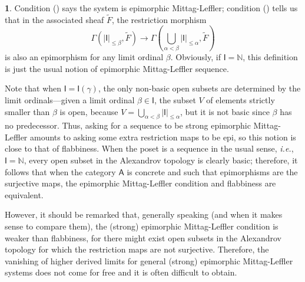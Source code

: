 \documentclass[reqno,11pt]{amsart}
\theoremstyle{plain}
\theoremstyle{remark}
\theoremstyle{definition}
\newtheorem{cosa}[thm]{}
\numberwithin{equation}{thm}
\newcommand{\SA}{\mathsf{A}}
\newcommand{\SI}{\mathsf{I}}
\newcommand{\NN}{\mathbb{N}}
\newcommand{\lto}{\longrightarrow}
\begin{document}
\begin{cosa}
		Condition () says the system is epimorphic Mittag-Leffler; condition () tells us that in the associated sheaf $\tilde{F}$, the restriction morphism 
		\[
			\Gamma(|\SI|_{\leq \beta}, \tilde{F}) \lto \Gamma(\bigcup_{\alpha < \beta} |\SI|_{\leq \alpha}, \tilde{F})
		\]
		is also an epimorphism for any limit ordinal $\beta$. Obviously, if $\SI = \NN$, this definition is just the usual notion of epimorphic Mittag-Leffler sequence.
		
		Note that when $\SI = \SI(\gamma)$, the only non-basic open subsets are determined by the limit ordinals---given a limit ordinal $\beta \in \SI$, the subset $V$ of elements strictly smaller than $\beta$ is open, because $V = \bigcup_{\alpha < \beta} |\SI|_{\leq \alpha}$, but it is not basic since $\beta$ has no predecessor. Thus, asking for a sequence to be strong epimorphic Mittag-Leffler amounts to asking some extra restriction maps to be epi, so this notion is close to that of flabbiness. When the poset is a sequence in the usual sense, \emph{i.e.}, $\SI = \NN$, every open subset in the Alexandrov topology is clearly basic; therefore, it follows that when the category $\SA$ is concrete and such that epimorphisms are the surjective maps, the epimorphic Mittag-Leffler condition and flabbiness are equivalent. 
		
		However, it should be remarked that, generally speaking (and when it makes sense to compare them), the (strong) epimorphic Mittag-Leffler condition is weaker than flabbiness, for there might exist open subsets in the Alexandrov topology for which the restriction maps are not surjective. Therefore, the vanishing of higher derived limits for general (strong) epimorphic Mittag-Leffler systems does not come for free and it is often difficult to obtain.	
	\end{cosa}
	
\end{document}
